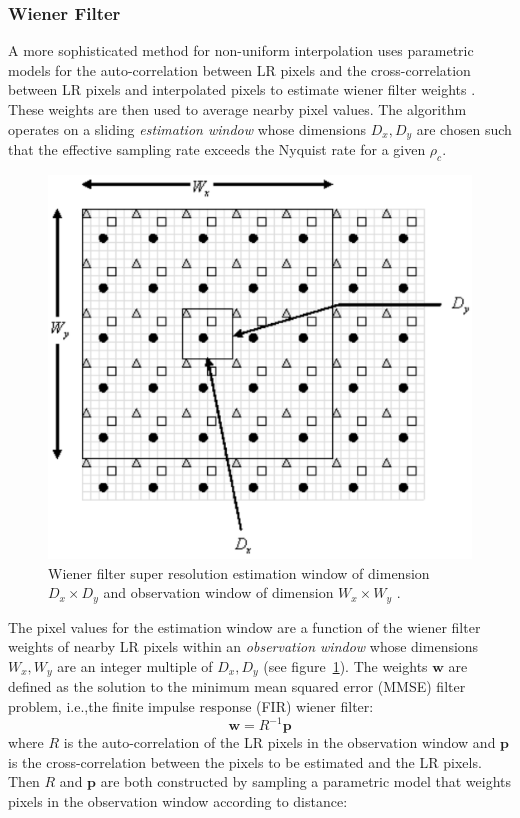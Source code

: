 \subsubsection{Wiener Filter}
A more sophisticated method for non-uniform interpolation uses parametric models for the auto-correlation between LR pixels and the cross-correlation between LR pixels and interpolated pixels to estimate wiener filter weights \cite{wiener}.
%
These weights are then used to average nearby pixel values.
%
The algorithm operates on a sliding \textit{estimation window} whose dimensions \(D_x, D_y\) are chosen such that the effective sampling rate exceeds the Nyquist rate for a given \(\rho_c\).
\begin{figure}
    \centering
    \includegraphics[width=.7\linewidth]{figures/classical/wiener.png}
    \caption{Wiener filter super resolution estimation window of dimension \(D_x \times D_y\) and observation window of dimension \(W_x \times W_y\) \cite{wiener}.}
    \label{fig:wiener}
\end{figure}
The pixel values for the estimation window are a function of the wiener filter weights of nearby LR pixels within an \textit{observation window} whose dimensions \(W_x, W_y\) are an integer multiple of \(D_x, D_y\) (see figure~\ref{fig:wiener}).
%
The weights \(\bm{w}\) are defined as the solution to the minimum mean squared error (MMSE) filter problem, i.e.,the finite impulse response (FIR) wiener filter:
\begin{equation}
    \bm{w} = R^{-1}\bm{p}
\end{equation}
where \(R\) is the auto-correlation of the LR pixels in the observation window and \(\bm{p}\) is the cross-correlation between the pixels to be estimated and the LR pixels.
%
Then \(R\) and \(\bm{p}\) are both constructed by sampling a parametric model that weights pixels in the observation window according to distance:
